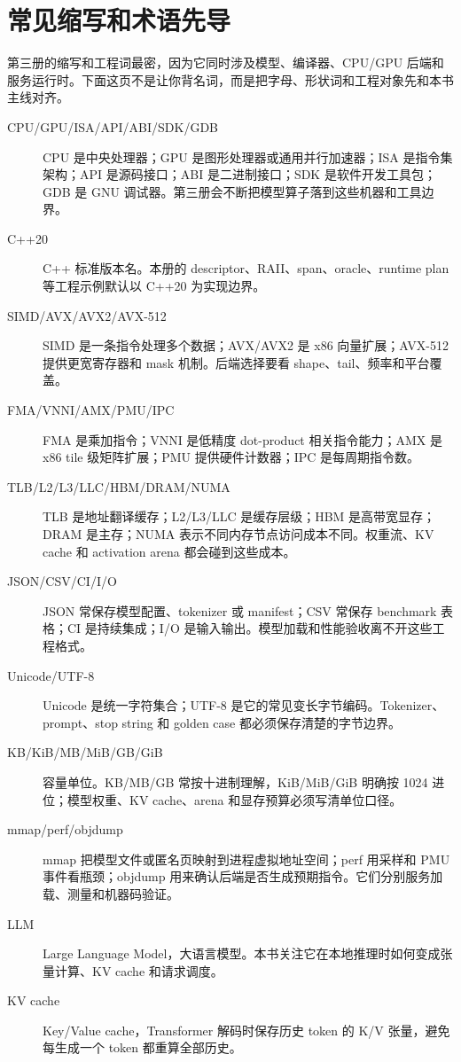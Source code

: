 \chapter*{常见缩写和术语先导}

第三册的缩写和工程词最密，因为它同时涉及模型、编译器、CPU/GPU 后端和服务运行时。下面这页不是让你背名词，而是把字母、形状词和工程对象先和本书主线对齐。

\begin{description}
  \item[CPU/GPU/ISA/API/ABI/SDK/GDB] CPU 是中央处理器；GPU 是图形处理器或通用并行加速器；ISA 是指令集架构；API 是源码接口；ABI 是二进制接口；SDK 是软件开发工具包；GDB 是 GNU 调试器。第三册会不断把模型算子落到这些机器和工具边界。
  \item[C++20] C++ 标准版本名。本册的 descriptor、RAII、span、oracle、runtime plan 等工程示例默认以 C++20 为实现边界。
  \item[SIMD/AVX/AVX2/AVX-512] SIMD 是一条指令处理多个数据；AVX/AVX2 是 x86 向量扩展；AVX-512 提供更宽寄存器和 mask 机制。后端选择要看 shape、tail、频率和平台覆盖。
  \item[FMA/VNNI/AMX/PMU/IPC] FMA 是乘加指令；VNNI 是低精度 dot-product 相关指令能力；AMX 是 x86 tile 级矩阵扩展；PMU 提供硬件计数器；IPC 是每周期指令数。
  \item[TLB/L2/L3/LLC/HBM/DRAM/NUMA] TLB 是地址翻译缓存；L2/L3/LLC 是缓存层级；HBM 是高带宽显存；DRAM 是主存；NUMA 表示不同内存节点访问成本不同。权重流、KV cache 和 activation arena 都会碰到这些成本。
  \item[JSON/CSV/CI/I/O] JSON 常保存模型配置、tokenizer 或 manifest；CSV 常保存 benchmark 表格；CI 是持续集成；I/O 是输入输出。模型加载和性能验收离不开这些工程格式。
  \item[Unicode/UTF-8] Unicode 是统一字符集合；UTF-8 是它的常见变长字节编码。Tokenizer、prompt、stop string 和 golden case 都必须保存清楚的字节边界。
  \item[KB/KiB/MB/MiB/GB/GiB] 容量单位。KB/MB/GB 常按十进制理解，KiB/MiB/GiB 明确按 1024 进位；模型权重、KV cache、arena 和显存预算必须写清单位口径。
  \item[mmap/perf/objdump] mmap 把模型文件或匿名页映射到进程虚拟地址空间；perf 用采样和 PMU 事件看瓶颈；objdump 用来确认后端是否生成预期指令。它们分别服务加载、测量和机器码验证。
  \item[LLM] Large Language Model，大语言模型。本书关注它在本地推理时如何变成张量计算、KV cache 和请求调度。
  \item[KV cache] Key/Value cache，Transformer 解码时保存历史 token 的 K/V 张量，避免每生成一个 token 都重算全部历史。

\end{description}
